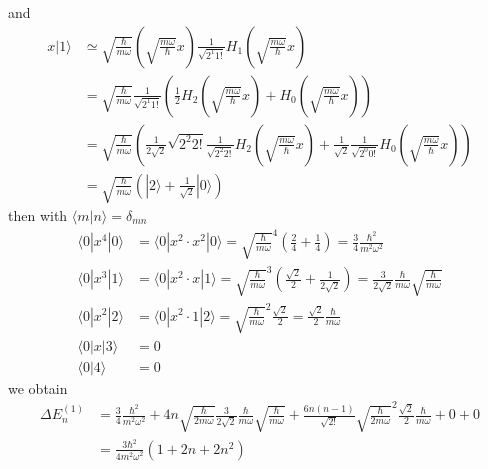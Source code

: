 \documentclass[../main.tex]{subfiles}
\begin{document}
and
\begin{align}
x|1\rangle
&\simeq \sqrt{\frac{\hbar}{m\omega}}\left(\sqrt{\frac{m\omega}{\hbar}}x\right)\frac{1}{\sqrt{2^1 1!}}H_1(\sqrt{\frac{m\omega}{\hbar}}x)\\
&=\sqrt{\frac{\hbar}{m\omega}}\frac{1}{\sqrt{2^1 1!}}\left(\frac{1}{2}H_2(\sqrt{\frac{m\omega}{\hbar}}x)+H_0(\sqrt{\frac{m\omega}{\hbar}}x)\right)\\
&=\sqrt{\frac{\hbar}{m\omega}}\left(\frac{1}{2\sqrt{2}}\sqrt{2^2 2!}\frac{1}{\sqrt{2^2 2!}}H_2(\sqrt{\frac{m\omega}{\hbar}}x)+\frac{1}{\sqrt{2}}\frac{1}{\sqrt{2^0 0!}}H_0(\sqrt{\frac{m\omega}{\hbar}}x)\right)\\
&=\sqrt{\frac{\hbar}{m\omega}}\left(|2\rangle+\frac{1}{\sqrt{2}}|0\rangle\right)
\end{align}
then with $\langle m|n\rangle=\delta_{mn}$
\begin{align}
\langle0|x^4|0\rangle
&=\langle0|x^2\cdot x^2|0\rangle
=\sqrt{\frac{\hbar}{m\omega}}^4\left(\frac{2}{4}+\frac{1}{4}\right)
=\frac{3}{4}\frac{\hbar^2}{m^2\omega^2}\\
\langle0|x^3|1\rangle
&=\langle0|x^2\cdot x|1\rangle
=\sqrt{\frac{\hbar}{m\omega}}^3\left(\frac{\sqrt{2}}{2}+\frac{1}{2\sqrt{2}}\right)
=\frac{3}{2\sqrt{2}}\frac{\hbar}{m\omega}\sqrt{\frac{\hbar}{m\omega}}\\
\langle0|x^2|2\rangle
&=\langle0|x^2\cdot 1|2\rangle
=\sqrt{\frac{\hbar}{m\omega}}^2\frac{\sqrt{2}}{2}=\frac{\sqrt{2}}{2}\frac{\hbar}{m\omega}\\
\langle0|x|3\rangle
&=0\\
\langle0|4\rangle
&=0
\end{align}
we obtain
\begin{align}
\Delta E^{(1)}_n
&=\frac{3}{4}\frac{\hbar^2}{m^2\omega^2}+4n\sqrt{\frac{\hbar}{2m\omega}}\frac{3}{2\sqrt{2}}\frac{\hbar}{m\omega}\sqrt{\frac{\hbar}{m\omega}}+\frac{6n(n-1)}{\sqrt{2!}}\sqrt{\frac{\hbar}{2m\omega}}^2\frac{\sqrt{2}}{2}\frac{\hbar}{m\omega}+0+0\\
&=\frac{3\hbar^2}{4m^2\omega^2}\left(1+2n+2n^2\right)
\end{align}
\end{document}
